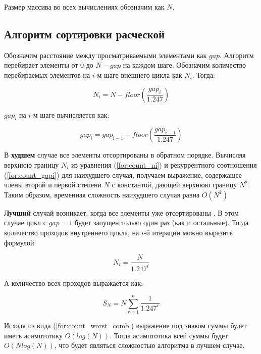 \documentclass[12pt]{report}
\begin{document}
	Размер массива во всех вычислениях обозначим как $N$.

	\subsection{Алгоритм сортировки расческой}

	Обозначим расстояние между просматриваемыми элементами как $gap$. Алгоритм перебирает элементы от 0 до $N-gap$ на каждом шаге. Обозначим количество перебираемых элементов на $i$-м шаге внешнего цикла как $N_{i}$. Тогда:
	
	\begin{equation}
	\label{for:count_ni}
	N_{i} = N - floor(\frac{gap_{i}}{1.247})
	\end{equation}
	
	
	$gap_{i}$ на $i$-м шаге вычисляется как:
	
	
	\begin{equation}
	\label{for:count_gapi}
	gap_{i} = gap_{i-1} - floor(\frac{gap_{i-1}}{1.247})
	\end{equation}
	
	В \textbf{худшем} случае все элементы отсортированы в обратном порядке. Вычисляя верхнюю границу $N_{i}$ из уравнения (\ref{for:count_ni}) и рекуррентного соотношения (\ref{for:count_gapi}) для наихудшего случая, получаем выражение, содержащее члены второй и первой степени $N$ с константой, дающей верхнюю границу $N^2$. Таким образом, временная сложность наихудшего случая равна $O(N^2)$
	
	\textbf{Лучший} случай возникает, когда все элементы уже отсортированы . В этом случае цикл с $gap=1$ будет запущен только один раз (как и остальные). Тогда количество проходов внутреннего цикла, на $i$-й итерации можно выразить формулой:
	
	\begin{equation}
	N_{i}=\frac{N}{1.247^{i}}
	\end{equation}
	
	А количество всех проходов выражается как:

	\begin{equation}
	\label{for:count_worst_comb}
	S_{N}=N\sum_{r=1}^{n} \frac{1}{1.247^r}
	\end{equation}
	
	Исходя из вида (\ref{for:count_worst_comb}) выражение под знаком суммы будет иметь асимптотику $O(log(N))$. Тогда асимптотика всей суммы будет $O(Nlog(N))$, что будет являться сложностью алгоритма в лучшем случае.
	
\end{document}
